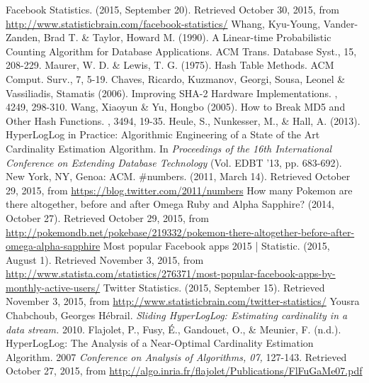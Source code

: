 \documentclass{article}
\begin{document}
\newpage
\begin{thebibliography}{9}
 Facebook Statistics. (2015, September 20). Retrieved October 30, 2015, from \url{http://www.statisticbrain.com/facebook-statistics/}
 Whang, Kyu-Young, Vander-Zanden, Brad T. \& Taylor, Howard M. (1990). A Linear-time Probabilistic Counting Algorithm for Database Applications. ACM Trans. Database Syst., 15, 208-229.
 Maurer, W. D. \& Lewis, T. G. (1975). Hash Table Methods. ACM Comput. Surv., 7, 5-19.
 Chaves, Ricardo, Kuzmanov, Georgi, Sousa, Leonel \& Vassiliadis, Stamatis (2006). Improving SHA-2 Hardware Implementations. , 4249, 298-310.
 Wang, Xiaoyun \& Yu, Hongbo (2005). How to Break MD5 and Other Hash Functions. , 3494, 19-35.
 Heule, S., Nunkesser, M., \& Hall, A. (2013). HyperLogLog in Practice: Algorithmic Engineering of a State of the Art Cardinality Estimation Algorithm. In \textit{Proceedings of the 16th International Conference on Extending Database Technology} (Vol. EDBT '13, pp. 683-692). New York, NY, Genoa: ACM.
 \#numbers. (2011, March 14). Retrieved October 29, 2015, from \url{https://blog.twitter.com/2011/numbers}
 How many Pokemon are there altogether, before and after Omega Ruby and Alpha Sapphire? (2014, October 27). Retrieved October 29, 2015, from \url{http://pokemondb.net/pokebase/219332/pokemon-there-altogether-before-after-omega-alpha-sapphire}
 Most popular Facebook apps 2015 | Statistic. (2015, August 1). Retrieved November 3, 2015, from \url{http://www.statista.com/statistics/276371/most-popular-facebook-apps-by-monthly-active-users/}
 Twitter Statistics. (2015, September 15). Retrieved November 3, 2015, from \url{http://www.statisticbrain.com/twitter-statistics/}
Yousra Chabchoub, Georges H\'ebrail. \textit{Sliding HyperLogLog: Estimating cardinality in a data stream.} 2010. 
 Flajolet, P., Fusy, \'E., Gandouet, O., \& Meunier, F. (n.d.). HyperLogLog: The Analysis of a Near-Optimal Cardinality Estimation Algorithm. 2007 \textit{Conference on Analysis of Algorithms, 07,} 127-143. Retrieved October 27, 2015, from \url{http://algo.inria.fr/flajolet/Publications/FlFuGaMe07.pdf}
\end{thebibliography}
\end{document}
